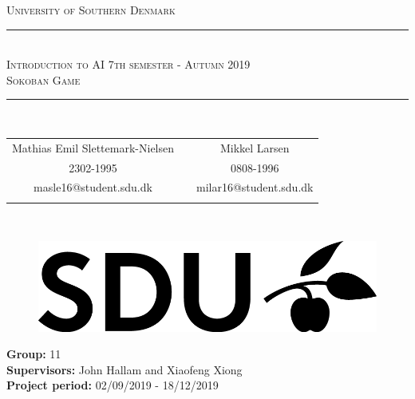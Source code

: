 \begin{titlepage}
    \thispagestyle{empty}
    \begin{center}
        \textsc{\LARGE University of Southern Denmark}
        \\[1.3cm]
        
        \rule{\linewidth}{0.5mm}
        \\[0.2cm]
        \textsc{\large Introduction to AI 7th semester - Autumn 2019}
        \\[0.3cm]
        \textsc{\LARGE Sokoban Game}
        \\[0.3cm]
        \rule{\linewidth}{0.5mm}
        \\[1cm]
        
        \begin{tabular}{c c c} 
        	Mathias Emil Slettemark-Nielsen & & Mikkel Larsen \\ 
        	2302-1995 & & 0808-1996 \\
        	masle16@student.sdu.dk & & milar16@student.sdu.dk \\
            \cline{1-1} \cline{3-3} \\
        \end{tabular}
        \\[2cm]
        
        \begin{figure}[H]
            \centering
            \includegraphics[width=\linewidth]{figures/SDU.png}
        \end{figure}
        
        \vfill
        
        \textbf{Group:} 11
        \\[0.25cm]
        
        \textbf{Supervisors:} John Hallam and Xiaofeng Xiong
        \\[0.25cm]
        
        \textbf{Project period:} 02/09/2019 - 18/12/2019
    \end{center}
\end{titlepage}